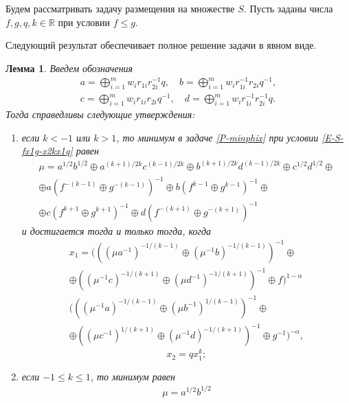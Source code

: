 \documentclass{spisok-article}
\newtheorem{lemma}{Лемма}
\begin{document}
Будем рассматривать задачу размещения на множестве $S$. Пусть заданы числа $f,g,q,k\in\mathbb{R}$ при условии $f\leq g$. 

Следующий результат обеспечивает полное решение задачи в явном виде.

\begin{lemma}
	Введем обозначения
\begin{equation*}
\begin{aligned}
a
=
\bigoplus_{i=1}^{m}w_{i}r_{1i}r_{2i}^{-1}q, \quad
b
=
\bigoplus_{i=1}^{m}w_{i}r_{1i}^{-1}r_{2i}q^{-1},
\\
c
=
\bigoplus_{i=1}^{m}w_{i}r_{1i}r_{2i}q^{-1}, \quad
d
=
\bigoplus_{i=1}^{m}w_{i}r_{1i}^{-1}r_{2i}^{-1}q.
\end{aligned}
\end{equation*}
	Тогда справедливы следующие утверждения:
	\begin{enumerate}\renewcommand\labelenumi{\textup{\theenumi)}}
		\item
		если $k<-1$ или $k>1$, то минимум в задаче \eqref{P-minphix} при условии \eqref{E-S-fx1g-x2kx1q} равен
		\begin{multline*}
		\mu
		=
		a^{1/2}b^{1/2}
		\oplus
		a^{(k+1)/2k}c^{(k-1)/2k}
		\oplus
		b^{(k+1)/2k}d^{(k-1)/2k}
		\oplus
		c^{1/2}d^{1/2}
		\oplus
		\\
		\oplus
		a(f^{-(k-1)} \oplus g^{-(k-1)})^{-1} 
		\oplus
		b(f^{k-1} \oplus g^{k-1})^{-1}
		\oplus
		\\
		\oplus
		c(f^{k+1} \oplus g^{k+1})^{-1}
		\oplus
		d(f^{-(k+1)} \oplus g^{-(k+1)})^{-1}
		\end{multline*}
		и достигается тогда и только тогда, когда
		\begin{multline*}
		x_{1}
		=
		(((\mu a^{-1})^{-1/(k-1)} \oplus (\mu^{-1}b)^{-1/(k-1)})^{-1}\oplus
		\\
		\oplus
		((\mu^{-1}c)^{-1/(k+1)} \oplus (\mu d^{-1})^{-1/(k+1)})^{-1}\oplus f)^{1-\alpha}\\
		(((\mu^{-1}a)^{-1/(k-1)} \oplus (\mu b^{-1})^{1/(k-1)} )^{-1}\oplus
		\\
		\oplus
		((\mu c^{-1})^{1/(k+1)} \oplus (\mu^{-1}d)^{-1/(k+1)})^{-1}\oplus g^{-1})^{-\alpha},
		\end{multline*}
		\begin{equation*}
		x_{2}
		=
		qx_{1}^{k};
		\end{equation*}
		\item
		если $-1\leq k\leq 1$, то минимум равен
		\begin{multline*}
		\mu
		=
		a^{1/2}b^{1/2}

\end{multline*}
\end{enumerate}
\end{lemma}
\end{document}
